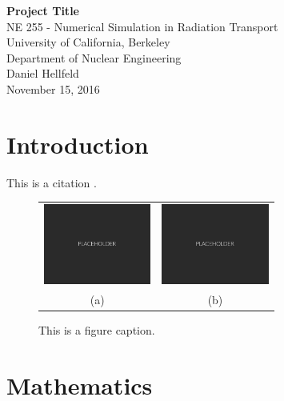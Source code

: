 \documentclass[10pt]{article}
\begin{document}
\begin{centering}
\textbf{Project Title}\\
\vspace{11pt}
NE 255 - Numerical Simulation in Radiation Transport\\
University of California, Berkeley\\
Department of Nuclear Engineering\\
\vspace{11pt}
Daniel Hellfeld\\
\vspace{11pt}
November 15, 2016 \\
\end{centering}


\section{Introduction}

\lipsum[1] 

\vspace{10pt}
This is a citation \cite{Agostinelli2003}.


\begin{figure}[htb]
\hypertarget{fig1}{}
\centering
\begin{tabular}{cc}
	\includegraphics[width=100pt]{Figures/Placeholder.png} & 
	\includegraphics[width=100pt]{Figures/Placeholder.png} \\
	\scriptsize{(a)} & \scriptsize{(b)}
\end{tabular}
\caption{This is a figure caption.}
\end{figure}






\section{Mathematics}
\end{document}
